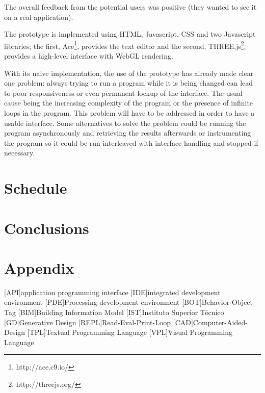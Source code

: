 \documentclass{./llncs2e/llncs}
\begin{document}
	The overall feedback from the potential users was positive (they wanted to see it on a real application).

	The prototype is implemented using HTML, Javascript, CSS and two Javascript libraries; the first, Ace\footnote{http://ace.c9.io/}, provides the text editor and the second, THREE.js\footnote{http://threejs.org/}, provides a high-level interface with WebGL rendering.

	With its naive implementation, the use of the prototype has already made clear one problem: always trying to run a program while it is being changed can lead to poor responsiveness or even permanent lockup of the interface.
	The usual cause being the increasing complexity of the program or the presence of infinite loops in the program. 
	This problem will have to be addressed in order to have a usable interface. 
	Some alternatives to solve the problem could be running the program asynchronously and retrieving the results afterwards or instrumenting the program so it could be run interleaved with interface handling and stopped if necessary.

\section{Schedule}


\section{Conclusions}

\newpage
\appendix
\section{Appendix}
\label{sec:attachments}

\begin{acronym}
	[API]{application programming interface}
	[IDE]{integrated development environment}
	[PDE]{Processing development environment}
	[BOT]{Behavior-Object-Tag}
	[BIM]{Building Information Model}
	[IST]{Instituto Superior Técnico}
	[GD]{Generative Design}
	[REPL]{Read-Eval-Print-Loop}
	[CAD]{Computer-Aided-Design}
	[TPL]{Textual Programming Language}
	[VPL]{Visual Programming Language}
\end{acronym}

% 
% 
 

 
\end{document}
